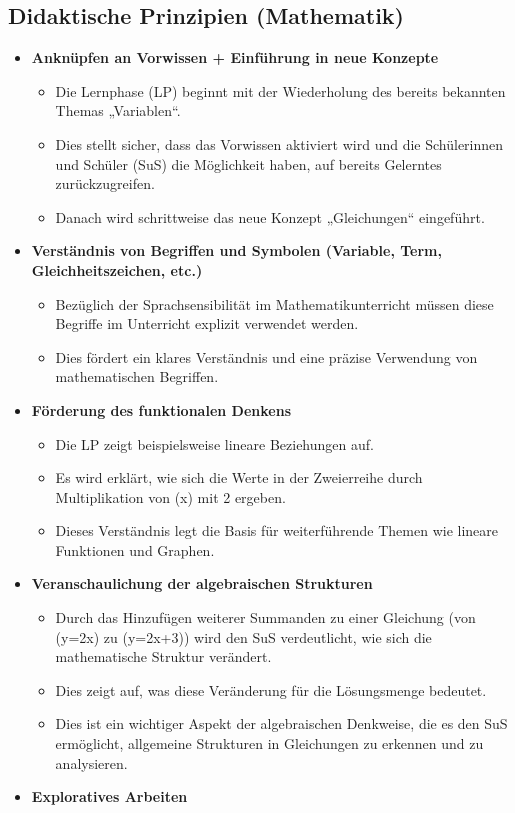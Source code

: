 \documentclass[
  10pt,
  a4paper,
  DIV=11]{scrartcl}
\providecommand{\tightlist}{%
  \setlength{\itemsep}{0pt}\setlength{\parskip}{0pt}}\usepackage{longtable,booktabs,array}
\begin{document}
\subsection{Didaktische Prinzipien
(Mathematik)}\label{didaktische-prinzipien-mathematik}

\begin{itemize}
\tightlist
\item
  \textbf{Anknüpfen an Vorwissen + Einführung in neue Konzepte}

  \begin{itemize}
  \tightlist
  \item
    Die Lernphase (LP) beginnt mit der Wiederholung des bereits
    bekannten Themas „Variablen``.
  \item
    Dies stellt sicher, dass das Vorwissen aktiviert wird und die
    Schülerinnen und Schüler (SuS) die Möglichkeit haben, auf bereits
    Gelerntes zurückzugreifen.
  \item
    Danach wird schrittweise das neue Konzept „Gleichungen`` eingeführt.
  \end{itemize}
\item
  \textbf{Verständnis von Begriffen und Symbolen (Variable, Term,
  Gleichheitszeichen, etc.)}

  \begin{itemize}
  \tightlist
  \item
    Bezüglich der Sprachsensibilität im Mathematikunterricht müssen
    diese Begriffe im Unterricht explizit verwendet werden.
  \item
    Dies fördert ein klares Verständnis und eine präzise Verwendung von
    mathematischen Begriffen.
  \end{itemize}
\item
  \textbf{Förderung des funktionalen Denkens}

  \begin{itemize}
  \tightlist
  \item
    Die LP zeigt beispielsweise lineare Beziehungen auf.
  \item
    Es wird erklärt, wie sich die Werte in der Zweierreihe durch
    Multiplikation von (x) mit 2 ergeben.
  \item
    Dieses Verständnis legt die Basis für weiterführende Themen wie
    lineare Funktionen und Graphen.
  \end{itemize}
\item
  \textbf{Veranschaulichung der algebraischen Strukturen}

  \begin{itemize}
  \tightlist
  \item
    Durch das Hinzufügen weiterer Summanden zu einer Gleichung (von
    (y=2x) zu (y=2x+3)) wird den SuS verdeutlicht, wie sich die
    mathematische Struktur verändert.
  \item
    Dies zeigt auf, was diese Veränderung für die Lösungsmenge bedeutet.
  \item
    Dies ist ein wichtiger Aspekt der algebraischen Denkweise, die es
    den SuS ermöglicht, allgemeine Strukturen in Gleichungen zu erkennen
    und zu analysieren.
  \end{itemize}
\item
  \textbf{Exploratives Arbeiten}


\end{itemize}
\end{document}
